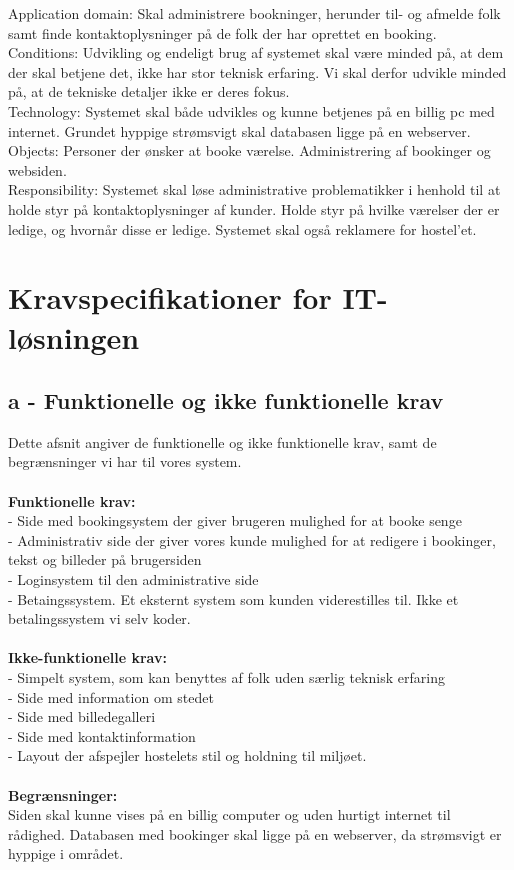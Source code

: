 \documentclass[12pt,a4paper]{article}
\begin{document}
Application domain: Skal administrere bookninger, herunder til- og afmelde folk samt finde kontaktoplysninger på de folk der har oprettet en booking.\\
 
Conditions: Udvikling og endeligt brug af systemet skal være minded på, at dem der skal betjene det, ikke har stor teknisk erfaring. Vi skal derfor udvikle minded på, at de tekniske detaljer ikke er deres fokus.\\

Technology: Systemet skal både udvikles og kunne betjenes på en billig pc med internet. Grundet hyppige strømsvigt skal databasen ligge på en webserver. \\

Objects: Personer der ønsker at booke værelse. Administrering af bookinger og websiden.\\

Responsibility: Systemet skal løse administrative problematikker i henhold til at holde styr på kontaktoplysninger af kunder. Holde styr på hvilke værelser der er ledige, og hvornår disse er ledige. Systemet skal også reklamere for hostel'et.\\
\newpage
\section{Kravspecifikationer for IT-løsningen}
\subsection{a - Funktionelle og ikke funktionelle krav}
Dette afsnit angiver de funktionelle og ikke funktionelle krav, samt de begrænsninger vi har til vores system.\\\\
\textbf{Funktionelle krav:} \\
- Side med bookingsystem der giver brugeren mulighed for at booke senge\\
- Administrativ side der giver vores kunde mulighed for at redigere i bookinger, tekst og billeder på brugersiden\\
- Loginsystem til den administrative side\\
- Betaingssystem. Et eksternt system som kunden viderestilles til. Ikke et betalingssystem vi selv koder.\\\\
       \textbf{Ikke-funktionelle krav:} \\
- Simpelt system, som kan benyttes af folk uden særlig teknisk erfaring\\
- Side med information om stedet\\
- Side med billedegalleri\\
- Side med kontaktinformation\\
- Layout der afspejler hostelets stil og holdning til miljøet. \\\\
      \textbf{Begrænsninger:} \\
	Siden skal kunne vises på en billig computer og uden hurtigt internet til rådighed. Databasen med bookinger skal ligge på en webserver, da strømsvigt er hyppige i området.
\newpage
\end{document}
